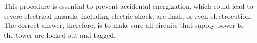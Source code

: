 This procedure is essential to prevent accidental energization, which could lead to severe electrical hazards, including electric shock, arc flash, or even electrocution. The correct answer, therefore, is to make sure all circuits that supply power to the tower are locked out and tagged.

